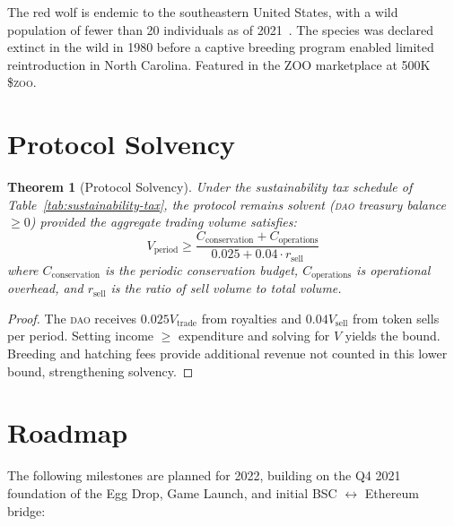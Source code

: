 \documentclass[11pt,letterpaper]{article}
\newtheorem{theorem}{Theorem}[section]
\newcommand{\DAO}{\textsc{dao}}
\newcommand{\ZOO}{\$\textsc{zoo}}
\begin{document}
The red wolf is endemic to the southeastern United States, with a wild population of
fewer than 20 individuals as of 2021~\cite{defenders2021}.  The species was declared
extinct in the wild in 1980 before a captive breeding program enabled limited
reintroduction in North Carolina.  Featured in the ZOO marketplace at 500K \ZOO{}.

\section{Protocol Solvency}
\label{sec:solvency}

\begin{theorem}[Protocol Solvency]
Under the sustainability tax schedule of Table~\ref{tab:sustainability-tax}, the protocol remains solvent (\DAO{} treasury balance $\geq 0$) provided the aggregate trading volume satisfies:
\begin{equation}
V_{\text{period}} \geq \frac{C_{\text{conservation}} + C_{\text{operations}}}{0.025 + 0.04 \cdot r_{\text{sell}}}
\label{eq:solvency}
\end{equation}
where $C_{\text{conservation}}$ is the periodic conservation budget, $C_{\text{operations}}$ is operational overhead, and $r_{\text{sell}}$ is the ratio of sell volume to total volume.
\end{theorem}

\begin{proof}
The \DAO{} receives $0.025V_{\text{trade}}$ from royalties and $0.04V_{\text{sell}}$ from token sells per period.  Setting income $\geq$ expenditure and solving for $V$ yields the bound.  Breeding and hatching fees provide additional revenue not counted in this lower bound, strengthening solvency.
\end{proof}

\section{Roadmap}
\label{sec:roadmap}

The following milestones are planned for 2022, building on the Q4 2021 foundation of the
Egg Drop, Game Launch, and initial BSC $\leftrightarrow$ Ethereum bridge:
\end{document}
